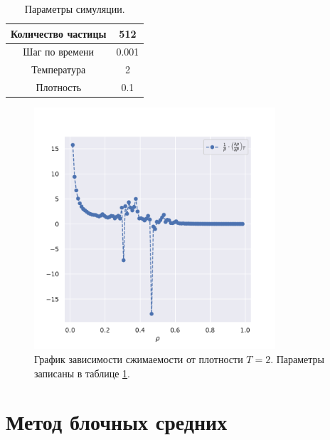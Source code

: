 \documentclass[a4paper,12pt]{report}
\begin{document}
\begin{table}[H]
    \centering
    \caption{Параметры симуляции.}
    \label{tab2}
    \begin{tabular}{| c | c |}
        \hline
        Количество частицы & 512 \\
        \hline
        Шаг по времени & 0.001 \\
        \hline
        Температура & 2 \\
        \hline
        Плотность & 0.1 \\
        \hline
    \end{tabular}
\end{table}

\begin{figure}[H]
    \centering
    \includegraphics[width=0.8\textwidth]{../../media/compr.pdf}
    \caption{График зависимости сжимаемости от плотности \(T = 2\). Параметры записаны в таблице \ref{tab2}.}
    \label{fig-compr}
\end{figure}

\section{Метод блочных средних}
\end{document}
